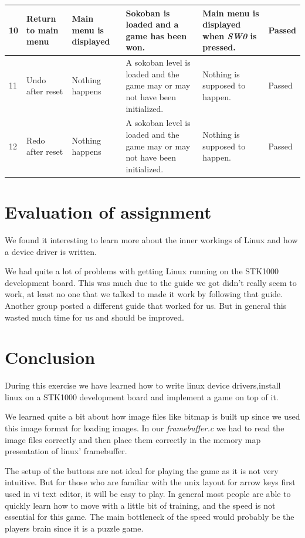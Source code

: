 \documentclass[a4paper,11pt]{article}
\begin{document}
\begin{center}
\begin{tabular}[pos]{|m{35pt}|m{45pt}|m{80pt}|m{90pt}|m{105pt}|m{40pt}|}
\hline 10 & Return to main menu & Main menu is displayed & Sokoban is loaded and a game has been won. & Main menu is displayed when \emph{SW0} is pressed.  & Passed \\

\hline 11 & Undo after reset & Nothing happens & A sokoban level is loaded and the game may or may not have been initialized. & Nothing is supposed to happen.  & Passed \\

\hline 12 & Redo after reset & Nothing happens & A sokoban level is loaded and the game may or may not have been initialized. & Nothing is supposed to happen.  & Passed \\

\hline 
\end{tabular} 
\end{center}

\newpage

\section{Evaluation of assignment}
We found it interesting to learn more about the inner workings of Linux and how a device driver is written. 

We had quite a lot of problems with getting Linux running on the STK1000 development board. This was much due to the guide we got didn't really seem to work, at least no one that we talked to made it work by following that guide. Another group posted a different guide that worked for us. But in general this wasted much time for us and should be improved. 

\section{Conclusion}
During this exercise we have learned how to write linux device drivers,install linux on a STK1000 development board and implement a game on top of it. 



We learned quite a bit about how image files like bitmap is built up since we used this image format for loading images. In our \textit{framebuffer.c} we had to read the image files correctly and then place them correctly in the memory map presentation of linux' framebuffer. 


The setup of the buttons are not ideal for playing the game as it is not very intuitive. But for those who are familiar with the unix layout for arrow keys first used in vi text editor, it will be easy to play. In general most people are able to quickly learn how to move with a little bit of training, and the speed is not essential for this game. The main bottleneck of the speed would probably be the players brain since it is a puzzle game.
\end{document}
